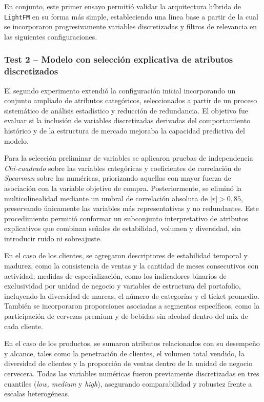 En conjunto, este primer ensayo permitió validar la arquitectura híbrida de \texttt{LightFM} en su forma más simple, estableciendo una línea base a partir de la cual se incorporaron progresivamente variables discretizadas y filtros de relevancia en las siguientes configuraciones.

\subsubsection{Test 2 – Modelo con selección explicativa de atributos discretizados}

El segundo experimento extendió la configuración inicial incorporando un conjunto ampliado de atributos categóricos, seleccionados a partir de un proceso sistemático de análisis estadístico y reducción de redundancia. El objetivo fue evaluar si la inclusión de variables discretizadas derivadas del comportamiento histórico y de la estructura de mercado mejoraba la capacidad predictiva del modelo.

Para la selección preliminar de variables se aplicaron pruebas de independencia \textit{Chi-cuadrado} sobre las variables categóricas y coeficientes de correlación de \textit{Spearman} sobre las numéricas, priorizando aquellas con mayor fuerza de asociación con la variable objetivo de compra. Posteriormente, se eliminó la multicolinealidad mediante un umbral de correlación absoluta de $|r| > 0{,}85$, preservando únicamente las variables más representativas y no redundantes. Este procedimiento permitió conformar un subconjunto interpretativo de atributos explicativos que combinan señales de estabilidad, volumen y diversidad, sin introducir ruido ni sobreajuste.

En el caso de los clientes, se agregaron descriptores de estabilidad temporal y madurez, como la consistencia de ventas y la cantidad de meses consecutivos con actividad; medidas de especialización, como los indicadores binarios de exclusividad por unidad de negocio y variables de estructura del portafolio, incluyendo la diversidad de marcas, el número de categorías y el ticket promedio. También se incorporaron proporciones asociadas a segmentos específicos, como la participación de cervezas premium y de bebidas sin alcohol dentro del mix de cada cliente.

En el caso de los productos, se sumaron atributos relacionados con su desempeño y alcance, tales como la penetración de clientes, el volumen total vendido, la diversidad de clientes y la proporción de ventas dentro de la unidad de negocio cervecera. Todas las variables numéricas fueron previamente discretizadas en tres cuantiles (\textit{low, medium} y \textit{high}), asegurando comparabilidad y robustez frente a escalas heterogéneas.

